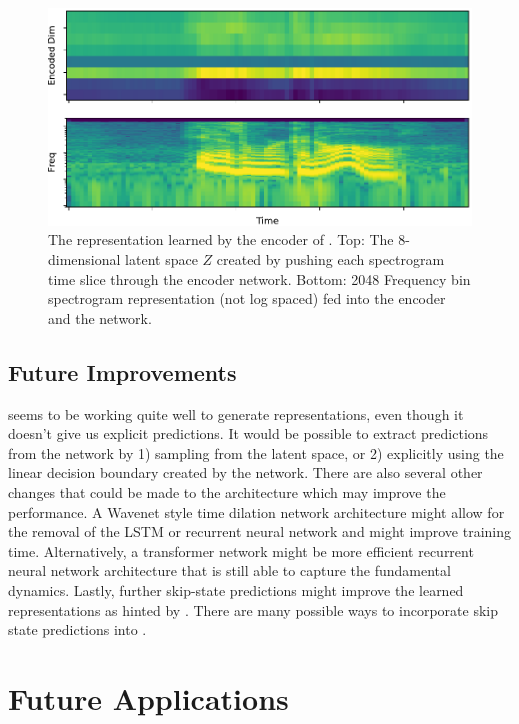 \begin{figure}[tbp] 
  \centering
  \includegraphics[width=\textwidth]{figures/encoder.pdf}
  \caption[8 dimensional $Z$ space learned by Contrastive Predictive Coding.]
{The representation learned by the encoder of \CPC. Top: The 8-dimensional latent space $Z$ created by pushing each spectrogram time slice through the encoder network. Bottom: 2048 Frequency bin spectrogram representation (not log spaced) fed into the encoder and the \CPC network.
}
  \label{fig:encoder}
\end{figure}

\subsection{Future Improvements}
\CPC seems to be working quite well to generate representations, even though it doesn't give us explicit predictions. It would be possible to extract predictions from the \CPC network by 1) sampling from the latent space, or 2) explicitly using the linear decision boundary created by the network. There are also several other changes that could be made to the architecture which may improve the performance. A Wavenet \cite{van2016wavenet} style time dilation network architecture might allow for the removal of the LSTM or recurrent neural network and might improve training time. Alternatively, a transformer network \cite{vaswani2017attention} might be more efficient recurrent neural network architecture that is still able to capture the fundamental dynamics. Lastly, further skip-state predictions might improve the learned representations as hinted by \cite{gregor2018temporal}. There are many possible ways to incorporate skip state predictions into \CPC.

\section{Future Applications}

